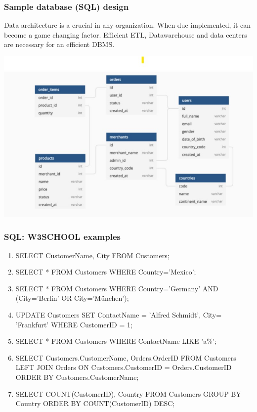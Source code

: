 \documentclass{beamer}
\begin{document}
\begin{frame}
    \centering
    \frametitle{Sample database (SQL) design}
    \begin{flushleft}
        Data architecture is a crucial in any organization. When due implemented, it can become a game changing factor. Efficient ETL, Datawarehouse and 
        data centers are necessary for an efficient DBMS.        
    \end{flushleft}
    \includegraphics[scale=0.5]{figures/db_design.jpg}
\end{frame}

\begin{frame}
    \frametitle{SQL: W3SCHOOL examples}
    \begin{enumerate}
\tiny        \item SELECT CustomerName, City FROM Customers; 
        \item SELECT * FROM Customers
        WHERE Country='Mexico';
        \item SELECT * FROM Customers
        WHERE Country='Germany' AND (City='Berlin' OR City='München');
        \item UPDATE Customers
        SET ContactName = 'Alfred Schmidt', City= 'Frankfurt'
        WHERE CustomerID = 1;
        \item SELECT * FROM Customers
        WHERE ContactName LIKE 'a\%';
        \item SELECT Customers.CustomerName, Orders.OrderID
        FROM Customers
        LEFT JOIN Orders ON Customers.CustomerID = Orders.CustomerID
        ORDER BY Customers.CustomerName;
        \item SELECT COUNT(CustomerID), Country
        FROM Customers
        GROUP BY Country
        ORDER BY COUNT(CustomerID) DESC;
    \end{enumerate}
\end{frame}
\end{document}

